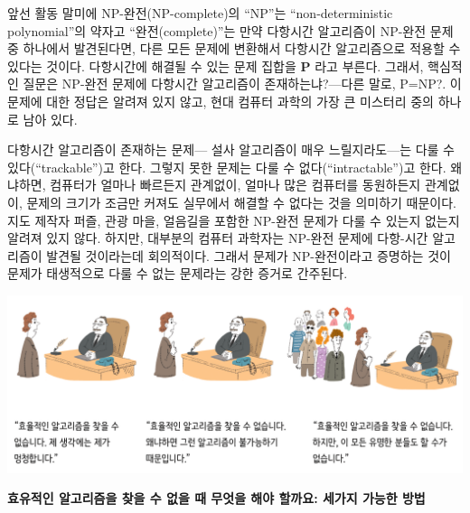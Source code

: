 \documentclass[]{article}
\begin{document}
앞선 활동 말미에 NP-완전(NP-complete)의 ``NP''는 ``non-deterministic
polynomial''의 약자고 ``완전(complete)''는 만약 다항시간 알고리즘이
NP-완전 문제 중 하나에서 발견된다면, 다른 모든 문제에 변환해서 다항시간
알고리즘으로 적용할 수 있다는 것이다. 다항시간에 해결될 수 있는 문제
집합을 \textbf{P} 라고 부른다. 그래서, 핵심적인 질문은 NP-완전 문제에
다항시간 알고리즘이 존재하는냐?---다른 말로, P=NP?. 이 문제에 대한
정답은 알려져 있지 않고, 현대 컴퓨터 과학의 가장 큰 미스터리 중의 하나로
남아 있다.

다항시간 알고리즘이 존재하는 문제--- 설사 알고리즘이 매우
느릴지라도---는 다룰 수 있다(``trackable'')고 한다. 그렇지 못한 문제는
다룰 수 없다(``intractable'')고 한다. 왜냐하면, 컴퓨터가 얼마나 빠르든지
관계없이, 얼마나 많은 컴퓨터를 동원하든지 관계없이, 문제의 크기가 조금만
커져도 실무에서 해결할 수 없다는 것을 의미하기 때문이다. 지도 제작자
퍼즐, 관광 마을, 얼음길을 포함한 NP-완전 문제가 다룰 수 있는지 없는지
알려져 있지 않다. 하지만, 대부분의 컴퓨터 과학자는 NP-완전 문제에
다항-시간 알고리즘이 발견될 것이라는데 회의적이다. 그래서 문제가
NP-완전이라고 증명하는 것이 문제가 태생적으로 다룰 수 없는 문제라는 강한
증거로 간주된다.

\includegraphics{csunplugged/04-part/img/ch16-steiner/15-steiner-10-comics.png}

\textbf{효유적인 알고리즘을 찾을 수 없을 때 무엇을 해야 할까요: 세가지
가능한 방법}
\end{document}
